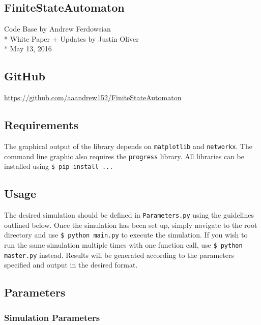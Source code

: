 \documentclass[11pt,twoside]{report}
\begin{document}
\begin{center}
\section*{FiniteStateAutomaton}

Code Base by Andrew Ferdowsian\\*
White Paper + Updates by Justin Oliver\\*
May 13, 2016
\end{center}

\subsection*{GitHub}

\url{https://github.com/aaandrew152/FiniteStateAutomaton}

\subsection*{Requirements}

The graphical output of the library depends on \texttt{matplotlib} and \texttt{networkx}. The command line graphic also requires the \texttt{progress} library. All libraries can be installed using \texttt{\$ pip install ...}

\subsection*{Usage}

The desired simulation should be defined in \texttt{Parameters.py} using the guidelines outlined below. Once the simulation has been set up, simply navigate to the root directory and use \texttt{\$ python main.py} to execute the simulation. If you wish to run the same simulation multiple times with one function call, use \texttt{\$ python master.py} instead. Results will be generated according to the parameters specified and output in the desired format. 

\subsection*{Parameters}

\subsubsection*{Simulation Parameters}
\end{document}
